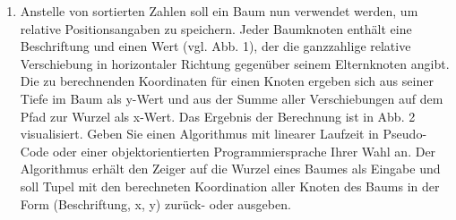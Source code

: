 \documentclass{lehramt-informatik-aufgabe}
\begin{document}
\begin{enumerate}
\item Anstelle von sortierten Zahlen soll ein Baum nun verwendet werden,
um relative Positionsangaben zu speichern. Jeder Baumknoten enthält
eine Beschriftung und einen Wert (vgl. Abb. 1), der die ganzzahlige
relative Verschiebung in horizontaler Richtung gegenüber seinem
Elternknoten angibt. Die zu berechnenden Koordinaten für einen Knoten
ergeben sich aus seiner Tiefe im Baum als y-Wert und aus der Summe aller
Verschiebungen auf dem Pfad zur Wurzel als x-Wert. Das Ergebnis der
Berechnung ist in Abb. 2 visualisiert. Geben Sie einen Algorithmus mit
linearer Laufzeit in Pseudo-Code oder einer objektorientierten
Programmiersprache Ihrer Wahl an. Der Algorithmus erhält den Zeiger auf
die Wurzel eines Baumes als Eingabe und soll Tupel mit den berechneten
Koordination aller Knoten des Baums in der Form (Beschriftung, x, y)
zurück- oder ausgeben.

\begin{liAntwort}
\end{liAntwort}

\end{enumerate}
\end{document}
